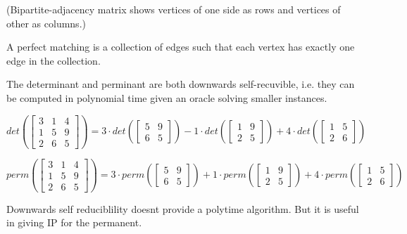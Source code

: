 \documentclass[a4paper,12pt]{article}
\theoremstyle{definition}
\theoremstyle{remark}
\begin{document}
(Bipartite-adjacency matrix shows vertices of one side as rows and vertices of other as columns.)

A perfect matching is a collection of edges such that each vertex has exactly one edge in the collection.

The determinant and perminant are both downwards self-recuvible, i.e. they can be computed in polynomial time
given an oracle solving smaller instances.

\begin{equation*}
    det(\begin{bmatrix}
        3 & 1 & 4 \\
        1 & 5 & 9 \\
        2 & 6 & 5
    \end{bmatrix})
    =
    3 \cdot det(\begin{bmatrix}
        5 & 9 \\
        6 & 5
    \end{bmatrix}) 
    - 1 \cdot det(\begin{bmatrix}
        1 & 9 \\
        2 & 5
    \end{bmatrix})
    + 4 \cdot det(\begin{bmatrix}
        1 & 5 \\
        2 & 6
    \end{bmatrix})
\end{equation*}

\begin{equation*}
    perm(\begin{bmatrix}
        3 & 1 & 4 \\
        1 & 5 & 9 \\
        2 & 6 & 5
    \end{bmatrix})
    =
    3 \cdot perm(\begin{bmatrix}
        5 & 9 \\
        6 & 5
    \end{bmatrix}) 
    + 1 \cdot perm(\begin{bmatrix}
        1 & 9 \\
        2 & 5
    \end{bmatrix})
    + 4 \cdot perm(\begin{bmatrix}
        1 & 5 \\
        2 & 6
    \end{bmatrix})
\end{equation*}

Downwards self reduciblility doesnt provide a polytime algorithm. But it is useful in giving IP for the permanent.
\end{document}
